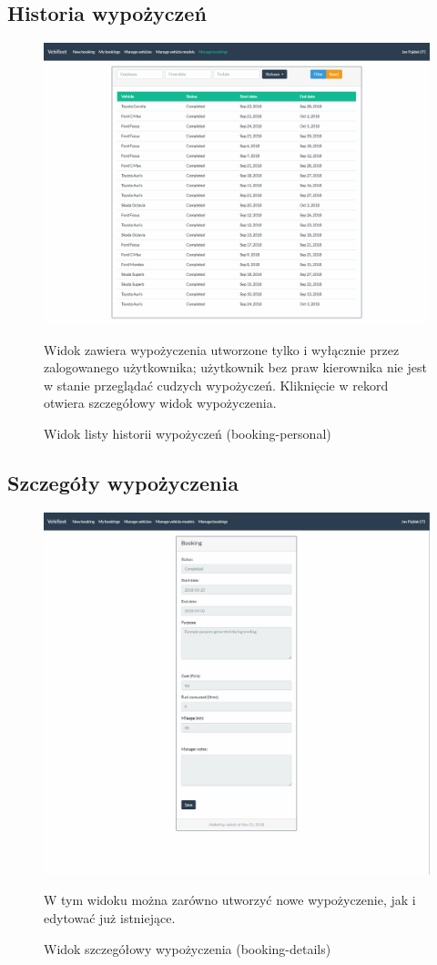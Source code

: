 \documentclass[eng,printmode,openany]{mgr}
\begin{document}
\subsection{Historia wypożyczeń}
\begin{figure}[H]
	\centering
	\includegraphics[width=\textwidth]{images/views/booking-list-manage.png}
	\caption{Widok listy historii wypożyczeń (booking-personal)}
	\small 
	Widok zawiera wypożyczenia utworzone tylko i wyłącznie przez zalogowanego użytkownika; użytkownik bez praw kierownika nie jest w stanie przeglądać cudzych wypożyczeń. Kliknięcie w rekord otwiera szczegółowy widok wypożyczenia.
\end{figure}

\subsection{Szczegóły wypożyczenia}
\begin{figure}[H]
	\centering
	\includegraphics[width=\textwidth]{images/views/booking-detail.png}
	\caption{Widok szczegółowy wypożyczenia (booking-details)}
	\small 
	W tym widoku można zarówno utworzyć nowe wypożyczenie, jak i edytować już istniejące.
\end{figure}
\end{document}

